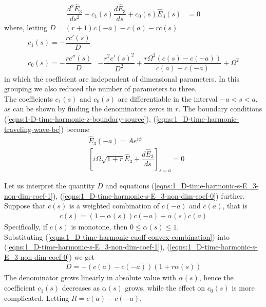 \documentclass[12pt,twoside]{report}
\begin{document}
\begin{align}
\label{eqns:1_D-time-harmonic-s-E_3-non-dim}
\dfrac{d^2\hat{E}_3}{ds^2}+c_1(s)\dfrac{d\hat{E}_3}{ds}+ c_0(s)\hat{E}_3(s) &=0 
\end{align}
where, letting $D = (r+1) c(-a)-c(a)-r c(s)$
\begin{subequations}
\begin{align}
\label{eqns:1_D-time-harmonic-s-E_3-non-dim-coef-1}
c_1(s) = -\dfrac{r c'(s) }{D}& \\
\label{eqns:1_D-time-harmonic-s-E_3-non-dim-coef-0}
c_0(s) = -\dfrac{r c''(s)}{D}&-\dfrac{r^2 c'(s)^2}{D^2} 
   +\dfrac{r \Omega ^2
   (c(s)-c(-a))}{c(a)-c(-a)}+\Omega ^2 
\end{align}
\end{subequations}
in which the coefficient are independent of dimensional parameters. In this grouping we also reduced the number of parameters to three.\\ 
The coefficients $c_1(s)$ and $c_0(s)$ are differentiable in the interval $-a<s<a$, as can be shown by finding the denominators zeros in $r$.
The boundary conditions (\ref{eqns:1-D-time-harmonic-z-boundary-source}),
 (\ref{eqns:1_D-time-harmonic-traveling-wave-bc}) become
\begin{subequations}
\begin{align}
\label{eqns:1-D-time-harmonic-z-boundary-source-normalized}
&\hat{E}_3(-a) = Ae^{i \phi} \\
\label{eqns:1_D-time-harmonic-traveling-wave-bc-normalized}
&\left[ i \Omega \sqrt{1+r} \hat{E}_3 +  \dfrac{d \hat{E}_3}{d s} \right]_{s = a}=0
\end{align}
\end{subequations}


Let us interpret the quantity $D$ and equations (\ref{eqns:1_D-time-harmonic-s-E_3-non-dim-coef-1}), (\ref{eqns:1_D-time-harmonic-s-E_3-non-dim-coef-0}) further. Suppose that $c(s)$ is a weighted combination of $c(-a)$ and $c(a)$, that is
\begin{align}
c(s) = (1-\alpha(s))c(-a) + \alpha(s) c(a) 
\end{align}
\label{eqns:1_D-time-harmonic-cuoff-convex-combination}
Specifically, if $c(s)$ is monotone, then $0 \leq \alpha(s) \leq 1$. \\
Substituting (\ref{eqns:1_D-time-harmonic-cuoff-convex-combination}) into (\ref{eqns:1_D-time-harmonic-s-E_3-non-dim-coef-1}), (\ref{eqns:1_D-time-harmonic-s-E_3-non-dim-coef-0}) we get
\begin{align*}
D = -(c(a)-c(-a)) (1+r \alpha (s))
\end{align*}
The denominator grows linearly in absolute value with $\alpha(s)$, hence the coefficient $c_1(s)$ decreases as $\alpha(s)$ grows, while the effect on $c_0(s)$ is more complicated. Letting $R = c(a)-c(-a)$, 
\end{document}
